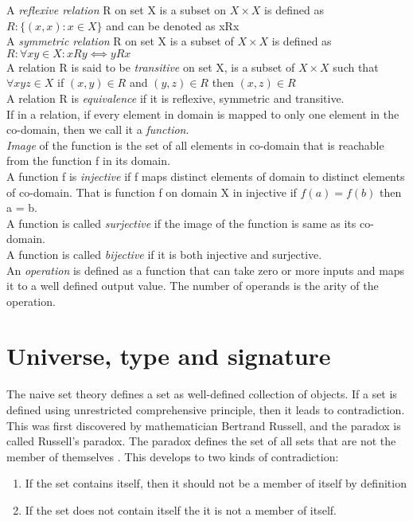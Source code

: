 A \emph{reflexive relation} R on set X is a subset on \(X \times X\)  is defined as \( R : \{(x,x) : x \in X\}\) and can be denoted as xRx \\

A \emph{symmetric relation} R on set X is a subset of \(X \times X\) is defined as \(R: \forall x y \in X: xRy ⟺ yRx\)  \\

A relation R is said to be \emph{transitive} on set X, is a subset of \(X \times X\) such that \(∀ x y z \in X \) if \((x,y) \in R\) and \((y,z) \in R \) then \((x,z) \in R\)\\

A relation R is \emph{equivalence} if it is reflexive, symmetric and transitive. \\

If in a relation, if every element in domain is mapped to only one element in the co-domain, then we call it a \emph{function}.\\

\emph{Image} of the function is the set of all elements in co-domain that is reachable from the function f in its domain.\\

A function f is \emph{injective} if f maps distinct elements of domain to distinct elements of co-domain. That is function f on domain X in injective if \(f(a) = f(b)\) then a = b.\\

A function is called \emph{surjective} if the image of the function is same as its co-domain.\\

A function is called \emph{bijective} if it is both injective and surjective.\\

An \emph{operation} is defined as a function that can take zero or more inputs and maps it to a well defined output value. The number of operands is the arity of the operation.

\section{Universe, type and signature}
The naive set theory defines a set as well-defined collection of objects. If a set is defined using unrestricted comprehensive principle\cite{enwiki:1125383109}, then it leads to contradiction. This was first discovered by mathematician Bertrand Russell, and the paradox is called Russell's paradox. The paradox defines the set of all sets that are not the member of themselves  \cite{russelPara}. This develops to two kinds of contradiction:
\begin{enumerate}
\item If the set contains itself, then it should not be a member of itself by definition
\item If the set does not contain itself the it is not a member of itself.
\end{enumerate}

